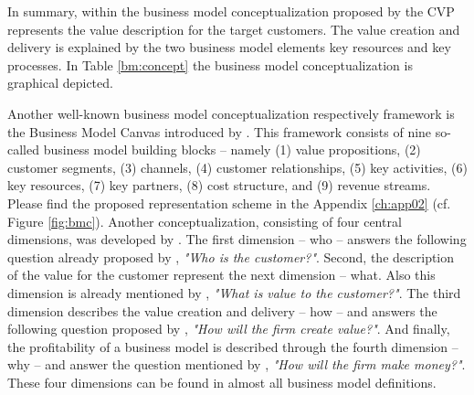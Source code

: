 In summary, within the business model conceptualization proposed by \citet[p. 54]{Johnson2008} the \ac{CVP} represents the value description for the target customers. The value creation and delivery is explained by the two business model elements key resources and key processes. In Table \ref{bm:concept} the business model conceptualization is graphical depicted.

Another well-known business model conceptualization respectively framework is the Business Model Canvas  introduced by \citet{Osterwalder2010}. This framework consists of nine so-called business model building blocks -- namely (1) value propositions, (2) customer segments, (3) channels, (4) customer relationships, (5) key activities, (6) key resources, (7) key partners, (8) cost structure, and (9) revenue streams. Please find the proposed representation scheme in the Appendix \ref{ch:app02} (cf. Figure \ref{fig:bmc}). Another conceptualization, consisting of four central dimensions, was developed by \citet{Frankenberger2013}. The first dimension -- who -- answers the following question already proposed by \citet[pp. 49-61]{Drucker1954}, \textit{"Who is the customer?"}. Second, the description of the value for the customer represent the next dimension -- what. Also this dimension is already mentioned by \citet[pp. 49-61]{Drucker1954}, \textit{"What is value to the customer?"}. The third dimension describes the value creation and delivery -- how -- and answers the following question proposed by \citet[pp. 729-732]{Morris2005}, \textit{"How will the firm create value?"}. And finally, the profitability of a business model is described through the fourth dimension -- why -- and answer the question mentioned by \citet[pp. 729-732]{Morris2005}, \textit{"How will the firm make money?"}. These four dimensions can be found in almost all business model definitions.

